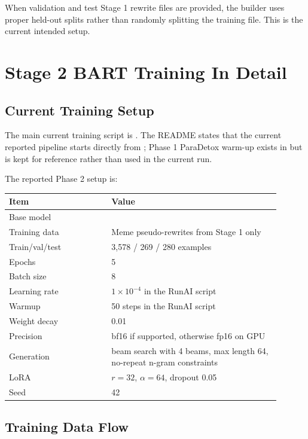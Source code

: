\documentclass[11pt,a4paper]{article}
\newcommand{\code}[1]{\texttt{\detokenize{#1}}}
\begin{document}
When validation and test Stage 1 rewrite files are provided, the builder uses proper held-out splits rather than randomly splitting the training file. This is the current intended setup.

\section{Stage 2 BART Training In Detail}

\subsection{Current Training Setup}

The main current training script is . The README states that the current reported pipeline starts directly from \code{facebook/bart-large}; Phase 1 ParaDetox warm-up exists in  but is kept for reference rather than used in the current run.

The reported Phase 2 setup is:

\begin{longtable}{p{0.34\linewidth}p{0.56\linewidth}}
\toprule
\textbf{Item} & \textbf{Value}\\
\midrule
Base model & \code{facebook/bart-large}\\
Training data & Meme pseudo-rewrites from Stage 1 only\\
Train/val/test & 3,578 / 269 / 280 examples\\
Epochs & 5\\
Batch size & 8\\
Learning rate & \(1 \times 10^{-4}\) in the RunAI script\\
Warmup & 50 steps in the RunAI script\\
Weight decay & 0.01\\
Precision & bf16 if supported, otherwise fp16 on GPU\\
Generation & beam search with 4 beams, max length 64, no-repeat n-gram constraints\\
LoRA & \(r=32\), \(\alpha=64\), dropout 0.05\\
Seed & 42\\
\bottomrule
\end{longtable}

\subsection{Training Data Flow}
\end{document}
